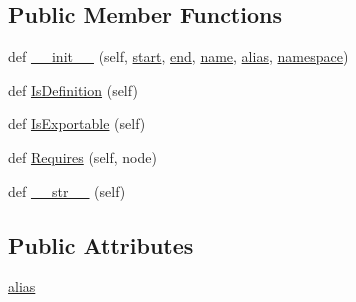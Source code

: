 \subsection*{Public Member Functions}
\begin{DoxyCompactItemize}
\item 
def \mbox{\hyperlink{classgoogletest-master_1_1googlemock_1_1scripts_1_1generator_1_1cpp_1_1ast_1_1_typedef_aafc206805f521114d3740c18abedd964}{\+\_\+\+\_\+init\+\_\+\+\_\+}} (self, \mbox{\hyperlink{classgoogletest-master_1_1googlemock_1_1scripts_1_1generator_1_1cpp_1_1ast_1_1_node_a6f9eb279a989f9ca27e7d0f1975336d1}{start}}, \mbox{\hyperlink{classgoogletest-master_1_1googlemock_1_1scripts_1_1generator_1_1cpp_1_1ast_1_1_node_a747e90ade89c1764e83b5b649bde18cc}{end}}, \mbox{\hyperlink{classgoogletest-master_1_1googlemock_1_1scripts_1_1generator_1_1cpp_1_1ast_1_1___generic_declaration_a85dc1c6f0115301c310cd3f99416fa86}{name}}, \mbox{\hyperlink{classgoogletest-master_1_1googlemock_1_1scripts_1_1generator_1_1cpp_1_1ast_1_1_typedef_a222f44ae556c0c1283d3939462701e20}{alias}}, \mbox{\hyperlink{classgoogletest-master_1_1googlemock_1_1scripts_1_1generator_1_1cpp_1_1ast_1_1___generic_declaration_a285067decd742f4effc0d1bc674bce85}{namespace}})
\item 
def \mbox{\hyperlink{classgoogletest-master_1_1googlemock_1_1scripts_1_1generator_1_1cpp_1_1ast_1_1_typedef_a3ce577b73ec6e341fe2848a7ff54dffa}{Is\+Definition}} (self)
\item 
def \mbox{\hyperlink{classgoogletest-master_1_1googlemock_1_1scripts_1_1generator_1_1cpp_1_1ast_1_1_typedef_ab5842a52e15d34455267c31672080cb2}{Is\+Exportable}} (self)
\item 
def \mbox{\hyperlink{classgoogletest-master_1_1googlemock_1_1scripts_1_1generator_1_1cpp_1_1ast_1_1_typedef_af8262594635a86d4673333e39a7d3835}{Requires}} (self, node)
\item 
def \mbox{\hyperlink{classgoogletest-master_1_1googlemock_1_1scripts_1_1generator_1_1cpp_1_1ast_1_1_typedef_a9d39bf0aaef7a2b29e01c913e265ebe5}{\+\_\+\+\_\+str\+\_\+\+\_\+}} (self)
\end{DoxyCompactItemize}
\subsection*{Public Attributes}
\begin{DoxyCompactItemize}
\item 
\mbox{\hyperlink{classgoogletest-master_1_1googlemock_1_1scripts_1_1generator_1_1cpp_1_1ast_1_1_typedef_a222f44ae556c0c1283d3939462701e20}{alias}}
\end{DoxyCompactItemize}


